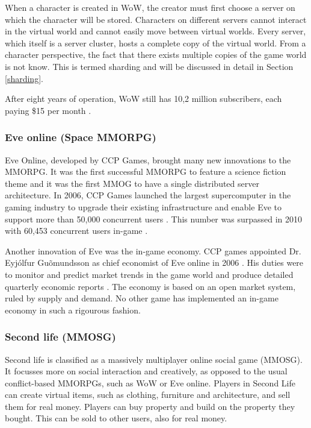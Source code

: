 When a character is created in WoW, the creator must first choose a server on which the character will be stored. Characters on different servers cannot interact in the virtual world and cannot easily move between virtual worlds. Every server, which itself is a server cluster, hosts a complete copy of the virtual world. From a character perspective, the fact that there exists multiple copies of the game world is not know. This is termed sharding and will be discussed in detail in Section \ref{sharding}.

After eight years of operation, WoW still has 10,2 million subscribers, each paying \$15 per month \cite{wow_firstq_fin_results_2012}.

\subsubsection{Eve online (Space MMORPG)}

Eve Online, developed by CCP Games, brought many new innovations to the MMORPG. It was the first successful MMORPG to feature a science fiction theme and it was the first MMOG to have a single distributed server architecture. In 2006, CCP Games launched the largest supercomputer in the gaming industry to upgrade their existing infrastructure and enable Eve to support more than 50,000 concurrent users \cite{eve_launces_supcom}. This number was surpassed in 2010 with 60,453 concurrent users in-game \cite{eve_pcu}.

Another innovation of Eve was the in-game economy. CCP games appointed Dr. Eyj\'{o}lfur Gu\~{o}mundsson as chief economist of Eve online in 2006 \cite{eve_economist}. His duties were to monitor and predict market trends in the game world and produce detailed quarterly economic reports \cite{eve_econ_rep}.  The economy is based on an open market system, ruled by supply and demand. No other game has implemented an in-game economy in such a rigourous fashion.

\subsubsection{Second life (MMOSG)}

Second life is classified as a massively multiplayer online social game (MMOSG). It focusses more on social interaction and creatively, as opposed to the usual conflict-based MMORPGs, such as WoW or Eve online. Players in Second Life can create virtual items, such as clothing, furniture and architecture, and sell them for real money. Players can buy property and build on the property they bought. This can be sold to other users, also for real money.

